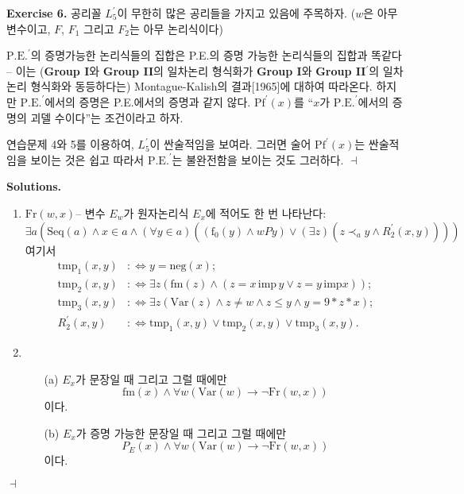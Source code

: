 \documentclass[12pt]{paper}
\newenvironment{context}[1][]
{ \noindent \textbf{{#1}.} }
{ \hfill $ \dashv $ }
\begin{document}
\begin{context}[Exercise 6]
공리꼴 $L_5^{\prime}$이 무한히 많은 공리들을 가지고 있음에 주목하자.
($w$은 아무 변수이고, $F$, $F_1$ 그리고 $F_2$는 아무 논리식이다)

$\mathrm{P.E.}^{\prime}$의 증명가능한 논리식들의 집합은 P.E.의 증명 가능한 논리식들의 집합과 똑같다 --
이는 (\textbf{Group I}와 \textbf{Group II}의 일차논리 형식화가 \textbf{Group I}와 \textbf{Group II}$^{\prime}$의 일차논리 형식화와 동등하다는) Montague-Kalish의 결과[1965]에 대하여 따라온다.
하지만 $\mathrm{P.E.}^{\prime}$에서의 증명은 P.E.에서의 증명과 같지 않다.
$\mathrm{Pf}^{\prime} \left( x \right)$를 ``$x$가 $\mathrm{P.E.}^{\prime}$에서의 증명의 괴델 수이다''는 조건이라고 하자.

연습문제 4와 5를 이용하여, $L_5^{\prime}$이 싼술적임을 보여라.
그러면 술어 $\mathrm{Pf}^{\prime} \left( x \right)$는 싼술적임을 보이는 것은 쉽고
따라서 $\mathrm{P.E.}^{\prime}$는 불완전함을 보이는 것도 그러하다.
\end{context}

\begin{context}[Solutions]
\begin{enumerate}
\item $\mathrm{Fr} \left( w , x \right)$--
변수 $E_w$가 원자논리식 $E_x$에 적어도 한 번 나타난다:
$$\exists a \left( \mathrm{Seq} \left( a \right) \land x \in a \land \left( \forall y \in a \right) \left( \left( \mathrm{f}_0 \left( y \right) \land w P y \right) \lor \left( \exists z \right) \left( z \prec_a y \land R_2^{\prime} \left( x , y \right) \right) \right) \right)$$
여기서
\begin{align*}
\mathrm{tmp}_1 \left( x , y \right) & :\iff y = \mathrm{neg} \left( x \right) ; \\
\mathrm{tmp}_2 \left( x , y \right) & :\iff \exists z \left( \mathrm{fm} \left( z \right) \land \left( z = x \, \mathrm{imp} \, y \lor z = y \, \mathrm{imp} x \right) \right) ; \\
\mathrm{tmp}_3 \left( x , y \right) & :\iff \exists z \left( \mathrm{Var} \left( z \right) \land z \ne w \land z \le y \land y = 9 * z * x \right) ; \\
R_2^{\prime} \left( x , y \right) & :\iff \mathrm{tmp}_1 \left( x , y \right) \lor \mathrm{tmp}_2 \left( x , y \right) \lor \mathrm{tmp}_3 \left( x , y \right) .
\end{align*}
\item
\begin{enumerate}
\item [(a)] $E_x$가 문장일 때 그리고 그럴 때에만 $$\mathrm{fm} \left( x \right) \land \forall w \left( \mathrm{Var} \left( w \right) \rightarrow \lnot \mathrm{Fr} \left( w , x \right) \right)$$이다.
\item [(b)] $E_x$가 증명 가능한 문장일 때 그리고 그럴 때에만 $$P_E \left( x \right) \land \forall w \left( \mathrm{Var} \left( w \right) \rightarrow \lnot \mathrm{Fr} \left( w , x \right) \right)$$이다.
\end{enumerate}
\end{enumerate}
\end{context}
\end{document}
